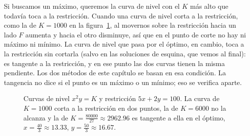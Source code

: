 \documentclass{article}
\begin{document}
Si buscamos un máximo, queremos la curva de nivel con el \(K\) más alto que todavía toca a la restricción. Cuando una curva de nivel corta a la restricción, como la de \(K=1000\) en la figura~\ref{fig:tangencia}, al movernos sobre la restricción hacia un lado \(F\) aumenta y hacia el otro disminuye, así que en el punto de corte no hay ni máximo ni mínimo. La curva de nivel que pasa por el óptimo, en cambio, toca a la restricción sin cortarla (salvo en las soluciones de esquina, que vemos al final): {\color{teal}es tangente a la restricción, y en ese punto las dos curvas tienen la misma pendiente}. Los dos métodos de este capítulo se basan en esa condición. La tangencia no dice si el punto es un máximo o un mínimo; eso se verifica aparte.
 
\begin{figure}[H]
    \centering
    \caption{Curvas de nivel \(x^2y=K\) y restricción \(5x+2y=100\). La curva de \(K=1000\) corta a la restricción en dos puntos, la de \(K=6000\) no la alcanza y la de \(K=\frac{80000}{27}\approx 2962.96\) es tangente a ella en el óptimo, \(x=\frac{40}{3}\approx 13.33\), \(y=\frac{50}{3}\approx 16.67\).}
    \label{fig:tangencia}
\end{figure}
 
\end{document}
